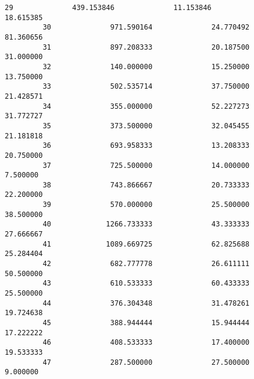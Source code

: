 \documentclass[11pt]{article}
\begin{document}
\begin{Verbatim}[commandchars=\\\{\}]
         29              439.153846              11.153846               18.615385   
         30              971.590164              24.770492               81.360656   
         31              897.208333              20.187500               31.000000   
         32              140.000000              15.250000               13.750000   
         33              502.535714              37.750000               21.428571   
         34              355.000000              52.227273               31.772727   
         35              373.500000              32.045455               21.181818   
         36              693.958333              13.208333               20.750000   
         37              725.500000              14.000000                7.500000   
         38              743.866667              20.733333               22.200000   
         39              570.000000              25.500000               38.500000   
         40             1266.733333              43.333333               27.666667   
         41             1089.669725              62.825688               25.284404   
         42              682.777778              26.611111               50.500000   
         43              610.533333              60.433333               25.500000   
         44              376.304348              31.478261               19.724638   
         45              388.944444              15.944444               17.222222   
         46              408.533333              17.400000               19.533333   
         47              287.500000              27.500000                9.000000   
         

\end{Verbatim}
\end{document}
